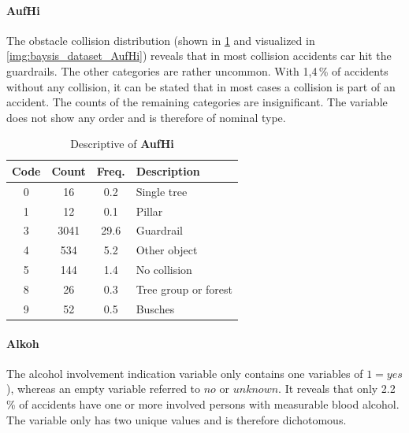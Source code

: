 \paragraph{AufHi}
\label{baysis_dataset_AufHi}
The obstacle collision distribution (shown in \cref{tbl:baysis_dataset_AufHi} and visualized in \cref{img:baysis_dataset_AufHi}) reveals that in most collision accidents car hit the guardrails. The other categories are rather uncommon. With 1,4\,\% of accidents without any collision, it can be stated that in most cases a collision is part of an accident. The counts of the remaining categories are insignificant. The variable does not show any order and is therefore of nominal type.
\begin{table}[ht]
	\centering
	\small
	\begin{tabular}{c|c|c|l} 
		\toprule
		Code & Count & Freq. & Description \\ 
		\midrule 
		0 & 16 		& 0.2	& Single tree \\
		1 & 12 		& 0.1	& Pillar \\
		3 & 3041	& 29.6	& Guardrail \\
		4 & 534		& 5.2	& Other object \\
		5 & 144		& 1.4	& No collision \\
		8 & 26		& 0.3	& Tree group or forest \\
		9 & 52		& 0.5	& Busches \\
		\bottomrule
	\end{tabular}
	\caption{Descriptive of \textbf{AufHi}}
	\label{tbl:baysis_dataset_AufHi}
	\vspace{-8mm}
\end{table}
\paragraph{Alkoh}
\label{baysis_dataset_Alkoh}
The alcohol involvement indication variable only contains one variables of $1 = yes$), whereas an empty variable referred to $no$ or $unknown$. It reveals that only 2.2\,\% of accidents have one or more involved persons with measurable blood alcohol. The variable only has two unique values and is therefore dichotomous.
